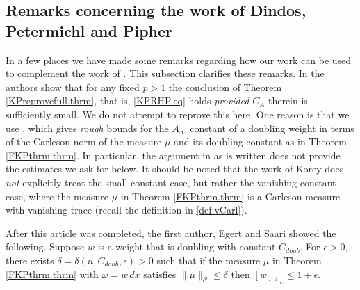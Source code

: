 \documentclass[11pt, a4paper,leqno]{amsart}
\theoremstyle{plain}
\theoremstyle{definition}
\theoremstyle{remark}
\newtheorem{remark}[equation]{Remark}
\numberwithin{equation}{section}
\newcommand{\ree}{\mathbb{R}^{n+1}}
\newcommand{\hm}{\omega}
\begin{document}

\subsection{Remarks concerning the work of Dindos, Petermichl and Pipher}\label{dppsect.sect}
In a few places we have made some remarks regarding how our work can be used to complement the work of \cite{DPP}. This subsection clarifies these remarks. In \cite{DPP} the authors show that for any fixed $p > 1$ the conclusion of Theorem \ref{KPreprovefull.thrm}, that is, \eqref{KPRHP.eq} holds {\it provided} $C_A$ therein is sufficiently small. We do not attempt to reprove this here. One reason is that we use \cite{FKP}, which gives {\it rough} bounds for the $A_\infty$ constant of a doubling weight in terms of the Carleson norm of the measure $\mu$ and its doubling constant as in Theorem \ref{FKPthrm.thrm}. In particular, the argument in \cite{FKP} as is written does not provide the estimates we ask for below. It should be noted that the work of Korey does {\it not} explicitly treat the small constant case, but rather the vanishing constant case, where the measure $\mu$ in Theorem \ref{FKPthrm.thrm} is a Carleson measure with vanishing trace (recall the definition in \eqref{def:vCarl}).


After this article was completed, the first author, Egert and Saari \cite{BES} showed the following. Suppose $w$ is a weight that is doubling with constant $C_{doub}$. For $\epsilon > 0$, there exists $ \delta = \delta(n, C_{doub},\epsilon) > 0$ such that if the measure $\mu$ in Theorem \ref{FKPthrm.thrm} with $\omega = w\, dx$ satisfies $\|\mu\|_{\mathcal{C}} \leq \delta$ then $[w]_{A_\infty} \leq 1 + \epsilon$.
\end{document}
